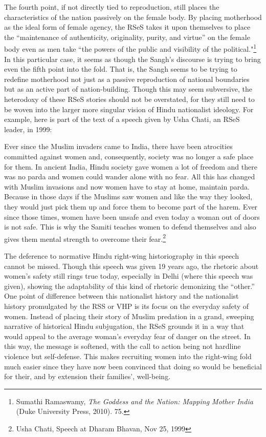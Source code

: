 \documentclass[a4paper, 12pt]{article}
\begin{document}
\par
The fourth point, if not directly tied to reproduction, still places the characteristics of the nation passively on the female body. By placing motherhood as the ideal form of female agency, the RSeS takes it upon themselves to place the “maintenance of authenticity, originality, purity, and virtue” on the female body even as men take “the powers of the public and visibility of the political."\footnote{Sumathi Ramaswamy, \textit{The Goddess and the Nation: Mapping Mother India} (Duke University Press, 2010). 75.} In this particular case, it seems as though the Sangh's discourse is trying to bring even the fifth point into the fold. That is, the Sangh seems to be trying to redefine motherhood not just as a passive reproduction of national boundaries but as an active part of nation-building. Though this may seem subversive, the heterodoxy of these RSeS stories should not be overstated, for they still need to be woven into the larger more singular vision of Hindu nationalist ideology. For example, here is part of the text of a speech given by Usha Chati, an RSeS leader, in 1999:\begin{displayquote} Ever since the Muslim invaders came to India, there have been atrocities committed against women and, consequently, society was no longer a safe place for them. In ancient India, Hindu society gave women a lot of freedom and there was no parda and women could wander alone with no fear. All this has changed with Muslim invasions and now women have to stay at home, maintain parda. Because in those days if the Muslims saw women and like the way they looked, they would just pick them up and force them to become part of the harem. Ever since those times, women have been unsafe and even today a woman out of doors is not safe. This is why the Samiti teaches women to defend themselves and also gives them mental strength to overcome their fear.\footnote{Usha Chati, Speech at Dharam Bhavan, Nov 25, 1999}\end{displayquote} The deference to normative Hindu right-wing historiography in this speech cannot be missed. Though this speech was given 19 years ago, the rhetoric about women’s safety still rings true today, especially in Delhi (where this speech was given), showing the adaptability of this kind of rhetoric demonizing the “other.” One point of difference between this nationalist history and the nationalist history promulgated by the RSS or VHP is its focus on the everyday safety of women. Instead of placing their story of Muslim predation in a grand, sweeping narrative of historical Hindu subjugation, the RSeS grounds it in a way that would appeal to the average woman’s everyday fear of danger on the street. In this way, the message is softened, with the call to action being not hardline violence but self-defense. This makes recruiting women into the right-wing fold much easier since they have now been convinced that doing so would be beneficial for their, and by extension their families’, well-being. 
\end{document}
